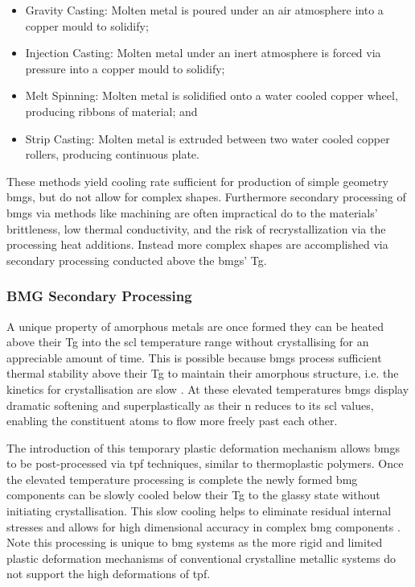 \documentclass[a4paper,12pt,oneside]{report}%
\begin{document}
\begin{itemize}
	\item Gravity Casting: Molten metal is poured under an air  atmosphere into a copper mould to solidify;
	\item Injection Casting: Molten metal under an inert atmosphere is forced via pressure into a copper mould to solidify;
	\item Melt Spinning: Molten metal is solidified onto a water cooled copper wheel, producing ribbons of material; and
	\item Strip Casting: Molten metal is extruded between two water cooled copper rollers, producing continuous plate. 
\end{itemize}

These methods yield cooling rate sufficient for production of simple geometry \glspl{bmg}, but do not allow for complex shapes. Furthermore secondary processing of \glspl{bmg} via methods like machining are often impractical do to the materials' brittleness, low thermal conductivity, and the risk of recrystallization via the processing heat additions. Instead more complex shapes are accomplished via secondary processing conducted above the \glspl{bmg}' \gls{Tg}. 

\subsubsection{BMG Secondary Processing}
A unique property of amorphous metals are once formed they can be heated above their \gls{Tg} into the \gls{scl} temperature range without crystallising for an appreciable amount of time. This is possible because \glspl{bmg} process sufficient thermal stability above their \gls{Tg} to maintain their amorphous structure, i.e. the kinetics for crystallisation are slow \cite{Schroers2010}. At these elevated temperatures \glspl{bmg} display dramatic softening and superplastically as their \gls{n} reduces to its \gls{scl} values, enabling the constituent atoms to flow more freely past each other. 

The introduction of this temporary plastic deformation mechanism allows \glspl{bmg} to be post-processed via \gls{tpf} techniques, similar to thermoplastic polymers. Once the elevated temperature processing is complete the newly formed \gls{bmg} components can be slowly cooled below their \gls{Tg} to the glassy state without initiating crystallisation. This slow cooling helps to eliminate residual internal stresses and allows for high dimensional accuracy in complex \gls{bmg} components \cite{Schroers2010}. Note this processing is unique to \gls{bmg} systems as the more rigid and limited plastic deformation mechanisms of conventional crystalline metallic systems do not support the high deformations of \gls{tpf}.
\end{document}
